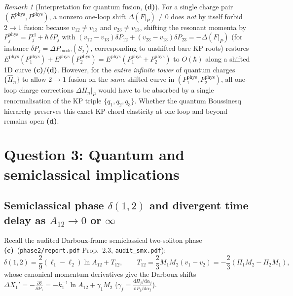 \documentclass[11pt,a4paper]{article}
\newcommand{\Lc}{\textsf{\textbf{(c)}}\xspace}
\newcommand{\Ld}{\textsf{\textbf{(d)}}\xspace}
\newcommand{\dd}{\mathrm{d}}
\newcommand{\hb}{\hbar}
\theoremstyle{remark}
\newtheorem{remark}[proposition]{Remark}
\begin{document}
\begin{remark}[Interpretation for quantum fusion, \Ld]\label{rem:quantum_conservation}
For a single charge pair $(E^{\mathrm{phys}},P^{\mathrm{phys}})$, a nonzero
one-loop shift $\Delta(F|_P) \ne 0$ does \emph{not} by itself forbid $2\to 1$
fusion: because $v_{12} \ne v_{13}$ and $v_{23} \ne v_{13}$, shifting the
resonant momenta by $P_j^{\mathrm{phys}} = P_j^{\mathrm{cl}} + \hb\,\delta P_j$
with $(v_{12}-v_{13})\delta P_{12} + (v_{23}-v_{13})\delta P_{23} = -\Delta(F|_P)$
(for instance $\delta P_j = \Delta P_{\mathrm{mode}}(S_j)$, corresponding to
unshifted bare KP roots) restores $E^{\mathrm{phys}}(P_1^{\mathrm{phys}}) + E^{\mathrm{phys}}(P_2^{\mathrm{phys}}) = E^{\mathrm{phys}}(P_1^{\mathrm{phys}}+P_2^{\mathrm{phys}})$
to $O(\hb)$ along a shifted 1D curve \Lc/\Ld. However, for the \emph{entire
infinite tower} of quantum charges $\{\hat{H}_n\}$ to allow $2\to 1$ fusion on
the \emph{same} shifted curve in $(P_1^{\mathrm{phys}},P_2^{\mathrm{phys}})$, all
one-loop charge corrections $\Delta H_n|_P$ would have to be absorbed by a
single renormalisation of the KP triple $\{q_1,q_2,q_3\}$. Whether the quantum
Boussinesq hierarchy preserves this exact KP-chord elasticity at one loop and
beyond remains open \Ld.
\end{remark}

\section{Question 3: Quantum and semiclassical implications}
\label{sec:quantum}

\subsection{Semiclassical phase \texorpdfstring{$\delta(1,2)$}{delta(1,2)} and divergent time delay as \texorpdfstring{$A_{12}\to 0$ or $\infty$}{A12 -> 0 or infty}}

Recall the audited Darboux-frame semiclassical two-soliton phase \Lc\
(\texttt{phase2/\allowbreak report.pdf} Prop.~2.3, \texttt{audit\_smx.pdf}):
\begin{equation}\label{eq:delta_semi}
  \delta(1,2) = \frac{2}{9}(\ell_1 - \ell_2)\ln A_{12} + T_{12}, \qquad
  T_{12} = \frac{2}{3}M_1 M_2(v_1 - v_2) = -\frac{2}{3}(\Pi_1 M_2 - \Pi_2 M_1),
\end{equation}
whose canonical momentum derivatives give the Darboux shifts
$\Delta X_1' = -\frac{\partial\delta}{\partial P_1} = -k_1^{-1}\ln A_{12} + \gamma_1 M_2$
($\gamma_j = \frac{\dd\Pi_j/\dd\alpha_j}{\dd P_j/\dd\alpha_j}$).
\end{document}
